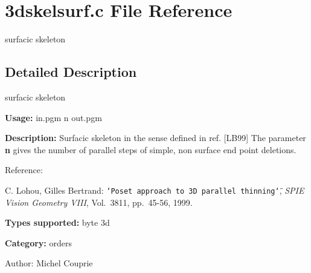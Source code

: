 \section{3dskelsurf.c File Reference}
\label{3dskelsurf_8c}
surfacic skeleton 



\subsection{Detailed Description}
surfacic skeleton 

{\bf Usage:} in.pgm n out.pgm

{\bf Description:} Surfacic skeleton in the sense defined in ref. [LB99] The parameter {\bf n} gives the number of parallel steps of simple, non surface end point deletions.

Reference:\par
 [LB99] C. Lohou, Gilles Bertrand: {\tt \char`\"{}Poset approach to 3D parallel thinning\char`\"{}}, {\em SPIE Vision Geometry VIII\/}, Vol.~3811, pp.~45-56, 1999.

{\bf Types supported:} byte 3d

{\bf Category:} orders

\begin{Desc}
\item[Author:]Michel Couprie \end{Desc}
